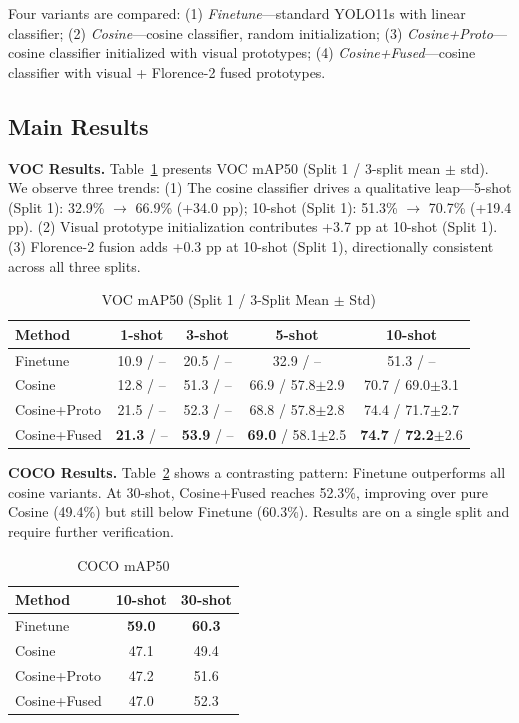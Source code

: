 \documentclass[conference]{IEEEtran}
\begin{document}
Four variants are compared: (1) \textit{Finetune}---standard YOLO11s with linear classifier; (2) \textit{Cosine}---cosine classifier, random initialization; (3) \textit{Cosine+Proto}---cosine classifier initialized with visual prototypes; (4) \textit{Cosine+Fused}---cosine classifier with visual + Florence-2 fused prototypes.

\subsection{Main Results}

\textbf{VOC Results.} Table~\ref{tab:voc_main} presents VOC mAP50 (Split 1 / 3-split mean $\pm$ std). We observe three trends: (1) The cosine classifier drives a qualitative leap---5-shot (Split 1): 32.9\% $\rightarrow$ 66.9\% (+34.0 pp); 10-shot (Split 1): 51.3\% $\rightarrow$ 70.7\% (+19.4 pp). (2) Visual prototype initialization contributes +3.7 pp at 10-shot (Split 1). (3) Florence-2 fusion adds +0.3 pp at 10-shot (Split 1), directionally consistent across all three splits.

\begin{table}[t]
\centering\footnotesize
\caption{VOC mAP50 (Split 1 / 3-Split Mean $\pm$ Std)}
\label{tab:voc_main}
\begin{tabular}{lcccc}
\toprule
Method & 1-shot & 3-shot & 5-shot & 10-shot \\
\midrule
Finetune      & 10.9 / --   & 20.5 / --    & 32.9 / --    & 51.3 / --     \\
Cosine        & 12.8 / --   & 51.3 / --    & 66.9 / 57.8$\pm$2.9 & 70.7 / 69.0$\pm$3.1 \\
Cosine+Proto  & 21.5 / --   & 52.3 / --    & 68.8 / 57.8$\pm$2.8 & 74.4 / 71.7$\pm$2.7 \\
Cosine+Fused  & \textbf{21.3} / -- & \textbf{53.9} / -- & \textbf{69.0} / 58.1$\pm$2.5 & \textbf{74.7} / \textbf{72.2}$\pm$2.6 \\
\bottomrule
\end{tabular}
\end{table}

\textbf{COCO Results.} Table~\ref{tab:coco_main} shows a contrasting pattern: Finetune outperforms all cosine variants. At 30-shot, Cosine+Fused reaches 52.3\%, improving over pure Cosine (49.4\%) but still below Finetune (60.3\%). Results are on a single split and require further verification.

\begin{table}[ht]
\centering
\caption{COCO mAP50}
\label{tab:coco_main}
\begin{tabular}{lcc}
\toprule
Method & 10-shot & 30-shot \\
\midrule
Finetune      & \textbf{59.0} & \textbf{60.3} \\
Cosine        & 47.1 & 49.4 \\
Cosine+Proto  & 47.2 & 51.6 \\
Cosine+Fused  & 47.0 & 52.3 \\
\bottomrule
\end{tabular}
\end{table}
\end{document}
